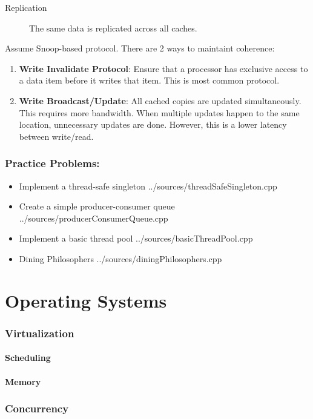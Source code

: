 \documentclass{article}
\begin{document}
\begin{description}
	\item[Replication]
	      The same data is replicated across all caches.
\end{description}
Assume Snoop-based protocol. There are 2 ways to maintaint coherence:
\begin{enumerate}
	\item \textbf{Write Invalidate Protocol}: Ensure that a processor has exclusive access to a data item before it writes that item. This is most common protocol.
	\item \textbf{Write Broadcast/Update}: All cached copies are updated simultaneously. This requires more bandwidth. When multiple updates happen to the same location, unnecessary updates are done. However, this is a lower latency between write/read.
\end{enumerate}
\section{Practice Problems:}
\begin{itemize}
	\item Implement a thread-safe singleton
	       {../sources/threadSafeSingleton.cpp}
	\item Create a simple producer-consumer queue
	       {../sources/producerConsumerQueue.cpp}
	\item Implement a basic thread pool
	       {../sources/basicThreadPool.cpp}
	\item Dining Philosophers
	       {../sources/diningPhilosophers.cpp}
\end{itemize}
\part{Operating Systems}
\section{Virtualization}
\subsection{Scheduling}
\subsection{Memory}
\section{Concurrency}
\end{document}
